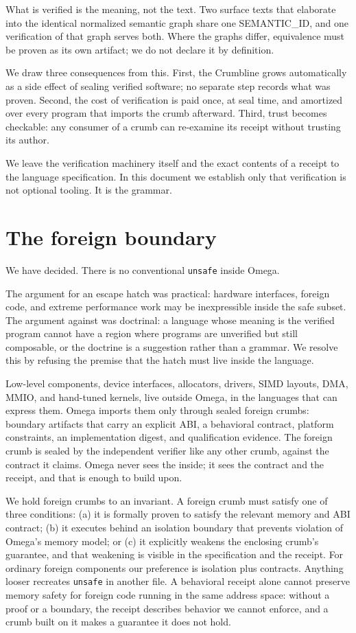 \documentclass[11pt]{article}
\begin{document}
What is verified is the meaning, not the text. Two surface texts that
elaborate into the identical normalized semantic graph share one
SEMANTIC\_ID, and one verification of that graph serves both. Where the
graphs differ, equivalence must be proven as its own artifact; we do not
declare it by definition.

We draw three consequences from this. First, the Crumbline grows
automatically as a side effect of sealing verified software; no separate step
records what was proven.
Second, the cost of verification is paid once, at seal time, and amortized
over every program that imports the crumb afterward. Third, trust becomes
checkable: any consumer of a crumb can re-examine its receipt without
trusting its author.

We leave the verification machinery itself and the exact contents of a
receipt to the language specification. In this document we establish only
that verification is not optional tooling. It is the grammar.

\section{The foreign boundary}
\label{sec:escape}

We have decided. There is no conventional \texttt{unsafe} inside Omega.

The argument for an escape hatch was practical: hardware interfaces,
foreign code, and extreme performance work may be inexpressible inside the
safe subset. The argument against was doctrinal: a language whose meaning
is the verified program cannot have a region where programs are
unverified but still composable, or the doctrine is a suggestion rather
than a grammar. We resolve this by refusing the premise that the hatch
must live inside the language.

Low-level components, device interfaces, allocators, drivers, SIMD
layouts, DMA, MMIO, and hand-tuned kernels, live outside Omega, in the
languages that can express them. Omega imports them only through sealed
foreign crumbs: boundary artifacts that carry an explicit ABI, a
behavioral contract, platform constraints, an implementation digest, and
qualification evidence. The foreign crumb is sealed by the independent
verifier like any other crumb, against the contract it claims. Omega never
sees the inside; it sees the contract and the receipt, and that is enough
to build upon.

We hold foreign crumbs to an invariant. A foreign crumb must satisfy one
of three conditions: (a) it is formally proven to satisfy the relevant
memory and ABI contract; (b) it executes behind an isolation boundary that
prevents violation of Omega's memory model; or (c) it explicitly weakens
the enclosing crumb's guarantee, and that weakening is visible in the
specification and the receipt. For ordinary foreign components our
preference is isolation plus contracts. Anything looser recreates
\texttt{unsafe} in another file. A behavioral receipt alone cannot
preserve memory safety for foreign code running in the same address space:
without a proof or a boundary, the receipt describes behavior we cannot
enforce, and a crumb built on it makes a guarantee it does not hold.
\end{document}
